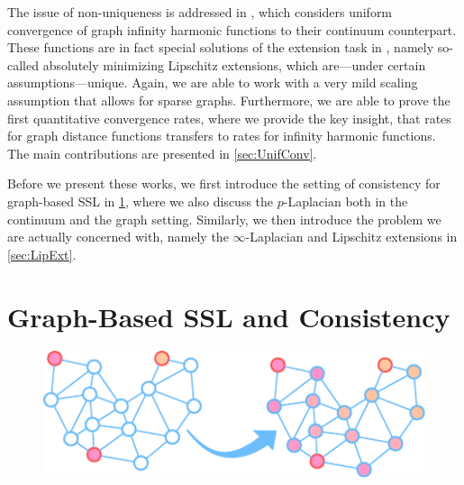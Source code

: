 The issue of non-uniqueness is addressed in \cite{bungert2021uniform}, which considers uniform convergence of graph infinity harmonic functions to their continuum counterpart. These functions are in fact special solutions of the extension task  in \cite{roith2022continuum}, namely so-called absolutely minimizing Lipschitz extensions, which are---under certain assumptions---unique. Again, we are able to work with a very mild scaling assumption that allows for sparse graphs. Furthermore, we are able to prove the first quantitative convergence rates, where we provide the key insight, that rates for graph distance functions transfers to rates for infinity harmonic functions. The main contributions are presented in \cref{sec:UnifConv}.


Before we present these works, we first introduce the setting of consistency for graph-based SSL in \cref{sec:GSSL}, where we also discuss the $p$-Laplacian both in the continuum and the graph setting. Similarly, we then introduce the problem we are actually concerned with, namely the $\infty$-Laplacian and Lipschitz extensions in \cref{sec:LipExt}.
%
%
%
%
%
\section{Graph-Based SSL and Consistency}\label{sec:GSSL}

\begin{figure}
\centering
\includegraphics[width=.5\textwidth]{atelier/paradigms/GSSL.pdf}
\end{figure}

